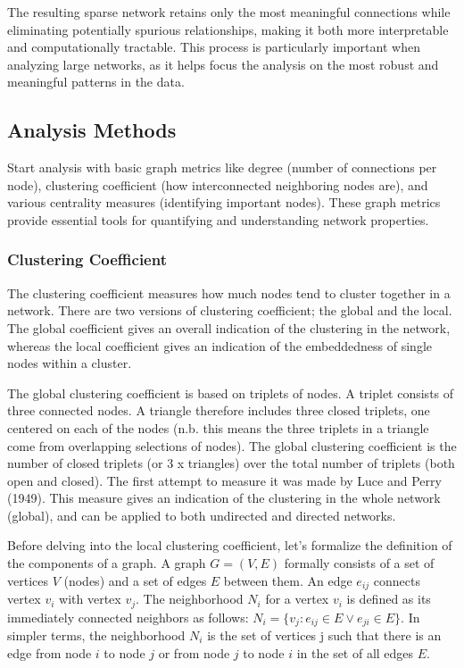 The resulting sparse network retains only the most meaningful connections while eliminating potentially spurious relationships, making it both more interpretable and computationally tractable. This process is particularly important when analyzing large networks, as it helps focus the analysis on the most robust and meaningful patterns in the data.

\subsection*{Analysis Methods}
Start analysis with basic graph metrics like degree (number of connections per node), clustering coefficient (how interconnected neighboring nodes are), and various centrality measures (identifying important nodes). These graph metrics provide essential tools for quantifying and understanding network properties.  

\subsubsection*{Clustering Coefficient}
The clustering coefficient measures how much nodes tend to cluster together in a network. There are two versions of clustering  coefficient; the global and the local. The global coefficient gives an overall indication of the clustering in the network, whereas the local coefficient gives an indication of the embeddedness of single nodes within a cluster. 

The global clustering coefficient is based on triplets of nodes. A triplet consists of three connected nodes. A triangle therefore includes three closed triplets, one centered on each of the nodes (n.b. this means the three triplets in a triangle come from overlapping selections of nodes). The global clustering coefficient is the number of closed triplets (or 3 x triangles) over the total number of triplets (both open and closed). The first attempt to measure it was made by Luce and Perry (1949). This measure gives an indication of the clustering in the whole network (global), and can be applied to both undirected and directed networks. 

Before delving into the local clustering coefficient, let's formalize the definition of the components of a graph. A graph $G=(V,E)$ formally consists of a set of vertices $V$ (nodes) and a set of edges $E$ between them. An edge $e_{ij}$ connects vertex $v_{i}$  with vertex $v_{j}$. The neighborhood $N_{i}$ for a vertex $v_{i}$ is defined as its immediately connected neighbors as follows: $N_i = \{v_j : e_{ij} \in E \lor e_{ji} \in E\}$. In simpler terms, the neighborhood $N_i$ is the set of vertices j such that there is an edge from node $i$ to node $j$ or from node $j$ to node $i$ in the set of all edges $E$.

